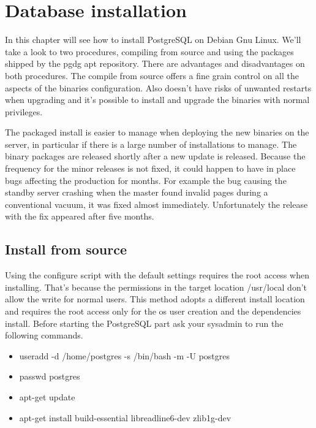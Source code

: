 \chapter{Database installation}
\label{cha:DB_INSTALL}
In this chapter will see how to install PostgreSQL on Debian Gnu Linux. We'll take a look to 
two procedures, compiling from source and using the packages shipped by the pgdg 
 apt repository.\newline 
There are advantages and disadvantages on both procedures. The compile from source offers a fine
grain control on all the aspects of the binaries configuration. Also doesn't have risks of
unwanted restarts when upgrading and it's possible to install and upgrade the binaries with normal
privileges.\newline

The packaged install is easier to manage when deploying the new binaries on the server, in
particular if there is a large number of installations to manage. The binary packages are
released shortly after a new update is released. Because the frequency for the minor
releases is not fixed, it could happen to have in place bugs affecting the production for months.
For example the bug causing the standby server crashing when the master found invalid pages during
a conventional vacuum, it was fixed almost immediately. Unfortunately the release with the fix
appeared after five months.\newline


\section{Install from source}
\label{sec:INSTSOURCE}
Using the configure script with the default settings requires the root access when installing.
That's because the permissions in the target location /usr/local don't allow the write for normal
users. This method adopts a different install location and requires the root access only for the os
user creation and the dependencies install. 
Before starting the PostgreSQL part ask your sysadmin to run the following commands.

\begin{itemize}

 \item useradd -d /home/postgres -s /bin/bash -m -U postgres
 \item passwd postgres 
 \item apt-get update
 \item apt-get install build-essential  libreadline6-dev  zlib1g-dev
\end{itemize}

